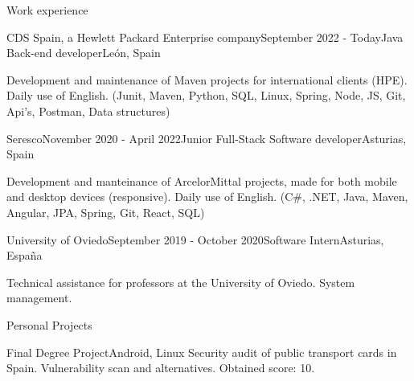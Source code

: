 \documentclass{resume} %
\begin{document}

\begin{rSection}{Work experience}

\begin{rSubsection}{CDS Spain, a Hewlett Packard Enterprise company}{September 2022 - Today}{Java Back-end developer}{León, Spain}
\item Development and maintenance of Maven projects for international clients (HPE). Daily use of English. (Junit, Maven, Python, SQL, Linux, Spring, Node, JS, Git, Api's, Postman, Data structures)
\end{rSubsection}

\begin{rSubsection}{Seresco}{November 2020 - April 2022}{Junior Full-Stack Software developer}{Asturias, Spain}
\item Development and manteinance of ArcelorMittal projects, made for both mobile and desktop devices (responsive). Daily use of English. (C\#, .NET, Java, Maven, Angular, JPA, Spring, Git, React, SQL)
\end{rSubsection}

\begin{rSubsection}{University of Oviedo}{September 2019 - October 2020}{Software Intern}{Asturias, España}
\item Technical assistance for professors at the University of Oviedo. System management.
\end{rSubsection}

\end{rSection}


\begin{rSection}{Personal Projects}
\begin{rSubsection}{{Final Degree Project}}{Android, Linux}{}{}
Security audit of public transport cards in Spain. Vulnerability scan and alternatives.
Obtained score: 10.
\end{rSubsection}
\end{rSection}


\end{document}
